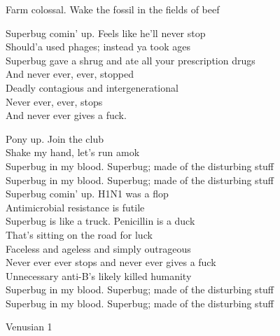 Farm colossal. Wake the fossil in the fields of beef \\




Superbug comin' up. Feels like he'll never stop \\
Should'a used phages; instead ya took ages \\
Superbug gave a shrug and ate all your prescription drugs \\
And never ever, ever, stopped \\
Deadly contagious and intergenerational \\
Never ever, ever, stops \\
And never ever gives a fuck.

Pony up. Join the club \\
Shake my hand, let's run amok \\

Superbug in my blood. Superbug; made of the disturbing stuff \\
Superbug in my blood. Superbug; made of the disturbing stuff \\

Superbug comin' up. H1N1 was a flop \\
Antimicrobial resistance is futile \\
Superbug is like a truck. Penicillin is a duck \\
That's sitting on the road for luck \\
Faceless and ageless and simply outrageous \\
Never ever ever stops and never ever gives a fuck \\

Unnecessary anti-B's likely killed humanity \\

Superbug in my blood. Superbug; made of the disturbing stuff \\
Superbug in my blood. Superbug; made of the disturbing stuff \\




Venusian 1 \\

